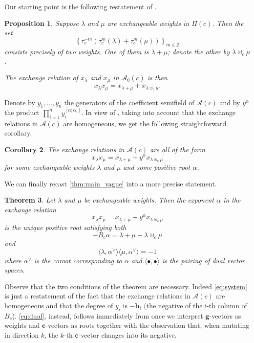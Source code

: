 \documentclass[11pt]{amsart}
\newcommand{\cA}{\mathcal{A}}
\newcommand{\ZZ}{\mathbb{Z}}
\newcommand{\bg}{\mathbf{g}}
\newcommand{\bc}{\mathbf{c}}
\newcommand{\bb}{\mathbf{b}}
\newtheorem{theorem}{Theorem}[section]
\newtheorem{corollary}[theorem]{Corollary}
\newtheorem{proposition}[theorem]{Proposition}
\numberwithin{equation}{section}
\numberwithin{figure}{section}
\begin{document}
  Our starting point is the following restatement of \cite[Propositions 5.1 and 5.2]{Ste13}. 
  \begin{proposition}
    \label{prop:coeff-free}
    Suppose $\lambda$ and $\mu$ are exchangeable weights in $\Pi(c)$. 
    Then the set
    \[
      \left\{
        \tau_c^{-m}\left(\tau_c^m(\lambda)+\tau_c^m(\mu)\right)
      \right\}_{m\in\ZZ}
    \]
    consists precisely of two weights. 
    One of them is $\lambda+\mu$; denote the other by $\lambda\uplus_c\mu$.

    The exchange relation of $x_\lambda$ and $x_\mu$ in $\cA_0(c)$ is then
    \[
      x_\lambda x_\mu = x_{\lambda+\mu} + x_{\lambda\uplus_c\mu}.
    \]
  \end{proposition}

  Denote by $y_1,\dots,y_n$ the generators of the coefficient semifield of $\cA(c)$ and by $y^\alpha$ the product $\prod_{i=1}^n y_i^{[\alpha;\alpha_i]}$.
  In view of \cite{NS14}, taking into account that the exchange relations in $\cA(c)$ are homogeneous, we get the following straightforward corollary.
  \begin{corollary}\label{cor:A0}
    The exchange relations in $\cA(c)$ are all of the form 
    \[
      x_\lambda x_\mu = x_{\lambda+\mu} + y^\alpha x_{\lambda\uplus_c\mu}
    \]
    for some exchangeable weights $\lambda$ and $\mu$ and some positive root $\alpha$.
  \end{corollary}

  We can finally recast \cref{thm:main_vague} into a more precise statement.
  \begin{theorem}
    \label{thm:main}
    Let $\lambda$ and $\mu$ be exchangeable weights. 
    Then the exponent $\alpha$ in the exchange relation
    \[
      x_\lambda x_\mu = x_{\lambda+\mu} + y^\alpha x_{\lambda\uplus_c\mu}
    \]
    is the unique positive root satisfying both
    \begin{equation}
      \label{eq:system}
      -B_c\alpha = \lambda+\mu-\lambda\uplus_c\mu
    \end{equation}
    and
    \begin{equation}
      \label{eq:dual}
      \langle\lambda,\alpha^\vee\rangle 
      \langle\mu,\alpha^\vee\rangle 
      = -1
    \end{equation}
    where $\alpha^\vee$ is the \emph{coroot} corresponding to $\alpha$ and $\langle\bullet,\bullet\rangle$ is the pairing of dual vector spaces.
  \end{theorem}
  Observe that the two conditions of the theorem are necessary. 
  Indeed \cref{eq:system} is just a restatement of the fact that the exchange relations in $\cA(c)$ are homogeneous and that the degree of $y_i$ is $-\bb_i$ (the negative of the i-th column of $B_c$).
  \cref{eq:dual}, instead, follows immediately from \cite[Eq. (1.11)]{NZ11} once we interpret $\bg$-vectors as weights and $\bc$-vectors as roots together with the observation that, when mutating in direction $k$, the $k$-th $\bc$-vector changes into its negative.
  
\end{document}
